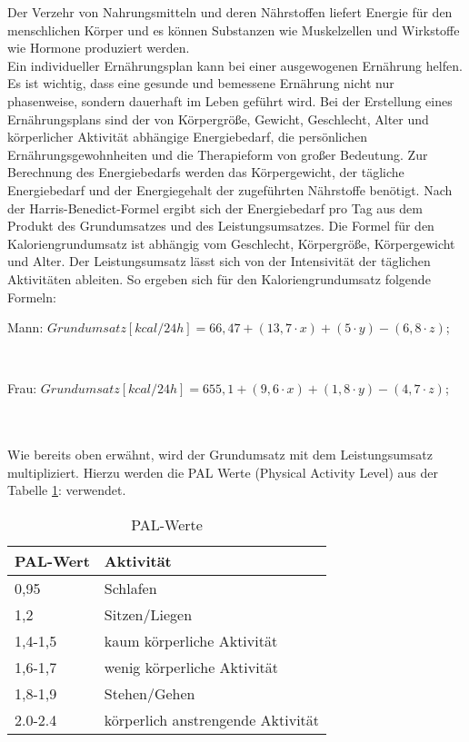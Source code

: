 		Der Verzehr von Nahrungsmitteln und deren Nährstoffen liefert Energie für den menschlichen Körper und es können Substanzen wie Muskelzellen und Wirkstoffe wie Hormone produziert werden. \cite{ND}\\
		Ein individueller Ernährungsplan kann bei einer ausgewogenen Ernährung helfen. Es ist wichtig, dass eine gesunde und bemessene Ernährung nicht nur phasenweise, sondern dauerhaft im Leben geführt wird. Bei der Erstellung eines Ernährungsplans sind der von Körpergröße, Gewicht, Geschlecht, Alter und körperlicher Aktivität abhängige Energiebedarf, die persönlichen Ernährungsgewohnheiten und die Therapieform von großer Bedeutung. Zur Berechnung des Energiebedarfs werden das Körpergewicht, der tägliche Energiebedarf und der Energiegehalt der zugeführten Nährstoffe benötigt. \cite{SG} \newline
		Nach der Harris-Benedict-Formel ergibt sich der Energiebedarf pro Tag aus dem Produkt des Grundumsatzes und des Leistungsumsatzes. Die Formel für den Kaloriengrundumsatz ist abhängig vom Geschlecht, Körpergröße, Körpergewicht und Alter. Der Leistungsumsatz lässt sich von der Intensivität der täglichen Aktivitäten ableiten. So ergeben sich für den Kaloriengrundumsatz folgende Formeln: \newline
		\\
		\centerline{Mann: $Grundumsatz [kcal/ 24h] {=} 66,47 + (13,7 \cdot x) + (5 \cdot y) - (6,8 \cdot z)$;}\\
		\centerline{Frau: $Grundumsatz [kcal/ 24h] {=} 655,1 + (9,6 \cdot x) + (1,8 \cdot y) - (4,7 \cdot z)$;}\\
		\noindent\hspace*{16mm}{x = Körpergewicht [kg];}\newline
		\noindent\hspace*{16mm}{y = Körpergröße [cm];}\newline
		\noindent{}\newline
		\\
	Wie bereits oben erwähnt, wird der Grundumsatz mit dem Leistungsumsatz multipliziert. Hierzu werden die PAL Werte (Physical Activity Level) aus der Tabelle \ref{tab:PAL-Werte}:  verwendet. \cite{SG}
	\begin{table}[H]
		\setlength{\tabcolsep}{12pt}
		\centering
		\begin{tabular}{ll}
			\toprule
			\textbf{PAL-Wert} & \textbf{Aktivität}\\
			\midrule
			0,95 & Schlafen\\
			1,2 & Sitzen/Liegen\\
			1,4-1,5 & kaum körperliche Aktivität\\
			1,6-1,7 & wenig körperliche Aktivität\\
			1,8-1,9 & Stehen/Gehen\\
			2.0-2.4 & körperlich anstrengende Aktivität\\
			\bottomrule
		\end{tabular}
		\captionsetup{justification=centering}
		\caption{PAL-Werte}
		\label{tab:PAL-Werte}
	\end{table}
